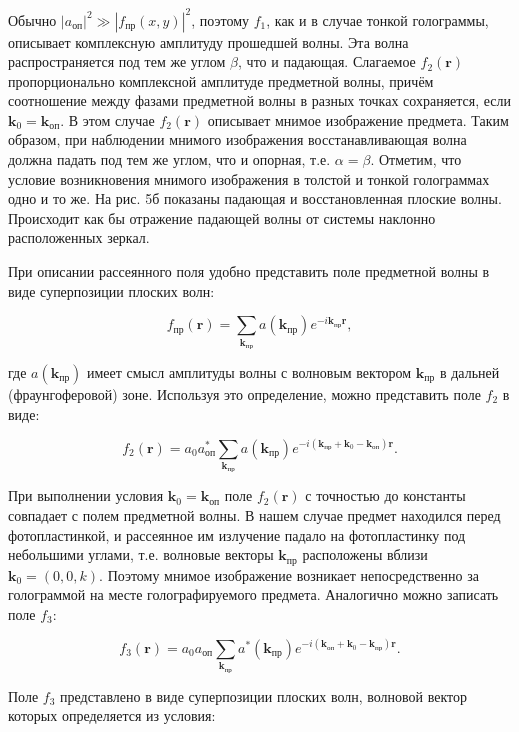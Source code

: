 \documentclass[a4paper,12pt]{article}
\begin{document}
Обычно $|a_{\text{оп}}|^2 \gg |f_{\text{пр}}(x, y)|^2$, поэтому $f_1$, как и в случае тонкой голограммы, описывает комплексную амплитуду прошедшей волны. Эта волна распространяется под тем же углом $\beta$, что и падающая. Слагаемое $f_2(\mathbf{r})$ пропорционально комплексной амплитуде предметной волны, причём соотношение между фазами предметной волны в разных точках сохраняется, если $\mathbf{k}_0 = \mathbf{k}_{\text{оп}}$. В этом случае $f_2(\mathbf{r})$ описывает мнимое изображение предмета. Таким образом, при наблюдении мнимого изображения восстанавливающая волна должна падать под тем же углом, что и опорная, т.е. $\alpha = \beta$. Отметим, что условие возникновения мнимого изображения в толстой и тонкой голограммах одно и то же. На рис. 5б показаны падающая и восстановленная плоские волны. Происходит как бы отражение падающей волны от системы наклонно расположенных зеркал.

При описании рассеянного поля удобно представить поле предметной волны в виде суперпозиции плоских волн:

$$
f_{\text{пр}}(\mathbf{r}) = \sum_{\mathbf{k}_{\text{пр}}} a(\mathbf{k}_{\text{пр}})e^{-i\mathbf{k}_{\text{пр}} \mathbf{r}},
$$

где $a(\mathbf{k}_{\text{пр}})$ имеет смысл амплитуды волны с волновым вектором $\mathbf{k}_{\text{пр}}$ в дальней (фраунгоферовой) зоне. Используя это определение, можно представить поле $f_2$ в виде:

$$
f_2(\mathbf{r}) = a_0 a_{\text{оп}}^{*} \sum_{\mathbf{k}_{\text{пр}}} a(\mathbf{k}_{\text{пр}})e^{-i(\mathbf{k}_{\text{пр}} + \mathbf{k}_0 - \mathbf{k}_{\text{оп}}) \mathbf{r}}.
$$

При выполнении условия $\mathbf{k}_0 = \mathbf{k}_{\text{оп}}$ поле $f_2(\mathbf{r})$ с точностью до константы совпадает с полем предметной волны. В нашем случае предмет находился перед фотопластинкой, и рассеянное им излучение падало на фотопластинку под небольшими углами, т.е. волновые векторы $\mathbf{k}_{\text{пр}}$ расположены вблизи $\mathbf{k}_0 = (0, 0, k)$. Поэтому мнимое изображение возникает непосредственно за голограммой на месте голографируемого предмета. Аналогично можно записать поле $f_3$:

$$
f_3(\mathbf{r}) = a_0 a_{\text{оп}} \sum_{\mathbf{k}_{\text{пр}}} a^{*}(\mathbf{k}_{\text{пр}}) e^{-i(\mathbf{k}_{\text{оп}} + \mathbf{k}_0 - \mathbf{k}_{\text{пр}}) \mathbf{r}}.
$$

Поле $f_3$ представлено в виде суперпозиции плоских волн, волновой вектор которых определяется из условия:
\end{document}
